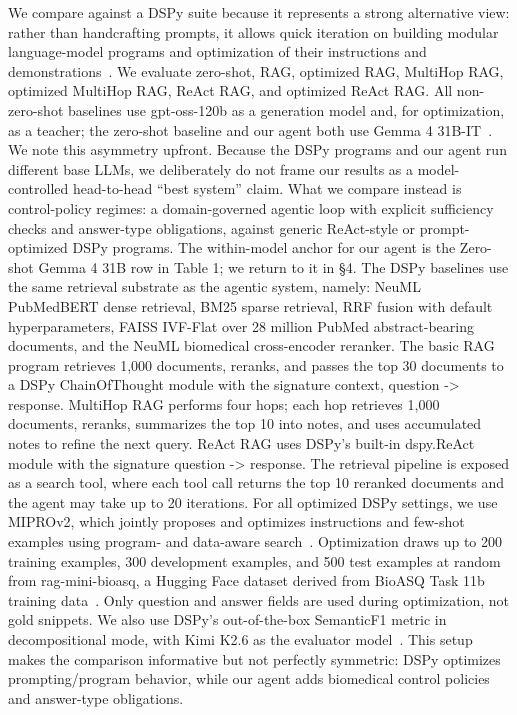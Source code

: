 \documentclass[sigconf,anonymous,review]{acmart}
\begin{document}
We compare against a DSPy suite because it represents a strong
alternative view: rather than handcrafting prompts, it allows quick
iteration on building modular language-model programs and optimization of their instructions and demonstrations~\cite{khattab2023dspy}. We evaluate
zero-shot, RAG, optimized RAG, MultiHop RAG, optimized MultiHop RAG, ReAct RAG, and optimized ReAct RAG. All non-zero-shot
baselines use gpt-oss-120b as a generation model and, for optimization, as a teacher; the zero-shot baseline and our agent both use
Gemma 4 31B-IT~\cite{openai2025gptoss}. We note this asymmetry upfront. Because
the DSPy programs and our agent run different base LLMs, we
deliberately do not frame our results as a model-controlled head-to-head ``best system'' claim. What we compare instead is control-policy
regimes: a domain-governed agentic loop with explicit sufficiency
checks and answer-type obligations, against generic ReAct-style or
prompt-optimized DSPy programs. The within-model anchor for
our agent is the Zero-shot Gemma 4 31B row in Table 1; we return
to it in \S 4. The DSPy baselines use the same retrieval substrate as
the agentic system, namely: NeuML PubMedBERT dense retrieval,
BM25 sparse retrieval, RRF fusion with default hyperparameters,
FAISS IVF-Flat over 28 million PubMed abstract-bearing documents,
and the NeuML biomedical cross-encoder reranker. The basic RAG
program retrieves 1,000 documents, reranks, and passes the top 30
documents to a DSPy ChainOfThought module with the signature
context, question -> response. MultiHop RAG performs four
hops; each hop retrieves 1,000 documents, reranks, summarizes the
top 10 into notes, and uses accumulated notes to refine the next
query. ReAct RAG uses DSPy's built-in dspy.ReAct module with
the signature question -> response. The retrieval pipeline is
exposed as a search tool, where each tool call returns the top 10
reranked documents and the agent may take up to 20 iterations.
For all optimized DSPy settings, we use MIPROv2, which jointly
proposes and optimizes instructions and few-shot examples using
program- and data-aware search~\cite{dspy2026mipro,opsahl2024mipro}. Optimization draws up to
200 training examples, 300 development examples, and 500 test examples at random from rag-mini-bioasq, a Hugging Face dataset
derived from BioASQ Task 11b training data~\cite{ragdatasets2024}. Only question
and answer fields are used during optimization, not gold snippets.
We also use DSPy's out-of-the-box SemanticF1 metric in decompositional mode, with Kimi K2.6 as the evaluator model~\cite{dspy2026semanticf1,moonshot2026}. This setup makes the comparison informative but not perfectly symmetric: DSPy optimizes prompting/program behavior, while our agent
adds biomedical control policies and answer-type obligations.
\end{document}
